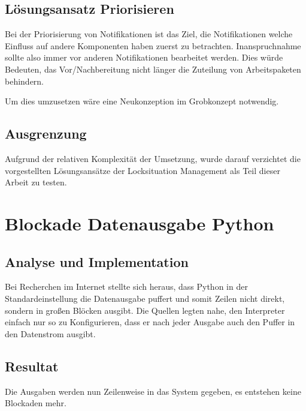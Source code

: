 \subsection{Lösungsansatz Priorisieren}

Bei der Priorisierung von Notifikationen ist das Ziel,
die Notifikationen welche Einfluss auf andere Komponenten haben zuerst zu betrachten.
Inanspruchnahme sollte also immer vor anderen Notifikationen bearbeitet werden.
Dies würde Bedeuten, das Vor/Nachbereitung nicht länger die Zuteilung von Arbeitspaketen behindern.

Um dies umzusetzen wäre eine Neukonzeption im Grobkonzept notwendig.


\subsection{Ausgrenzung}

Aufgrund der relativen Komplexität der Umsetzung,
wurde darauf verzichtet die vorgestellten Lösungsansätze der Locksituation Management
als Teil dieser Arbeit zu testen.

\section{Blockade Datenausgabe Python}
\subsection{Analyse und Implementation}

Bei Recherchen im Internet stellte sich heraus,
dass Python in der Standardeinstellung die Datenausgabe puffert und somit Zeilen nicht direkt,
sondern in großen Blöcken ausgibt.
Die Quellen legten nahe, den Interpreter einfach nur so zu Konfigurieren,
dass er nach jeder Ausgabe auch den Puffer in den Datenstrom ausgibt.

\subsection{Resultat}

Die Ausgaben werden nun Zeilenweise in das System gegeben,
es entstehen keine Blockaden mehr.